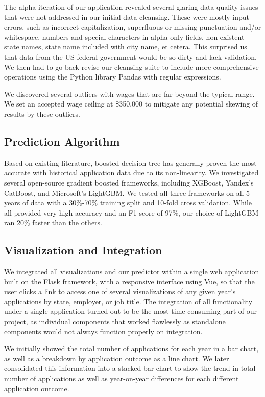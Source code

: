 \documentclass[sigconf]{acmart}
\begin{document}
The alpha iteration of our application revealed several glaring data quality issues that were not addressed in our initial 
data cleansing. These were mostly input errors, such as incorrect capitalization, 
superfluous or missing punctuation and/or whitespace, 
numbers and special characters in alpha only fields, 
non-existent state names, state name included with city name, et cetera. 
This surprised us that data from the US federal government would be so dirty and lack validation. 
We then had to go back revise our cleansing suite to include more comprehensive operations using the 
Python library Pandas with regular expressions. 



We discovered several outliers with wages that are far beyond the typical range. 
We set an accepted wage ceiling at \$350,000 to mitigate any potential skewing of results 
by these outliers. 


\subsection{Prediction Algorithm}
Based on existing literature, boosted decision tree has generally proven 
the most accurate with historical application data due to its non-linearity. 
We investigated several open-source gradient boosted frameworks, including XGBoost, 
Yandex’s CatBoost, and Microsoft’s LightGBM. We tested all three frameworks on 
all 5 years of data with a 30\%-70\% training split and 10-fold cross validation. 
While all provided very high accuracy and an F1 score of 97\%, our choice of LightGBM ran 20\% faster than the others. 


\subsection{Visualization and Integration}
We integrated all visualizations and our predictor within a single 
web application built on the Flask framework, with a responsive interface using Vue, so that 
the user clicks a link to access one of several visualizations of any given year's applications 
by state, employer, or job title. The integration of all functionality under a single application 
turned out to be the most time-consuming part of our project, as individual components that worked 
flawlessly as standalone components would not always function properly on integration. 

We initially showed the total number of applications for each year in a bar chart, as well as a breakdown by application 
outcome as a line chart. We later consolidated this information into a stacked bar chart to show the trend in total number 
of applications as well as year-on-year differences for each different application outcome. 
\end{document}
